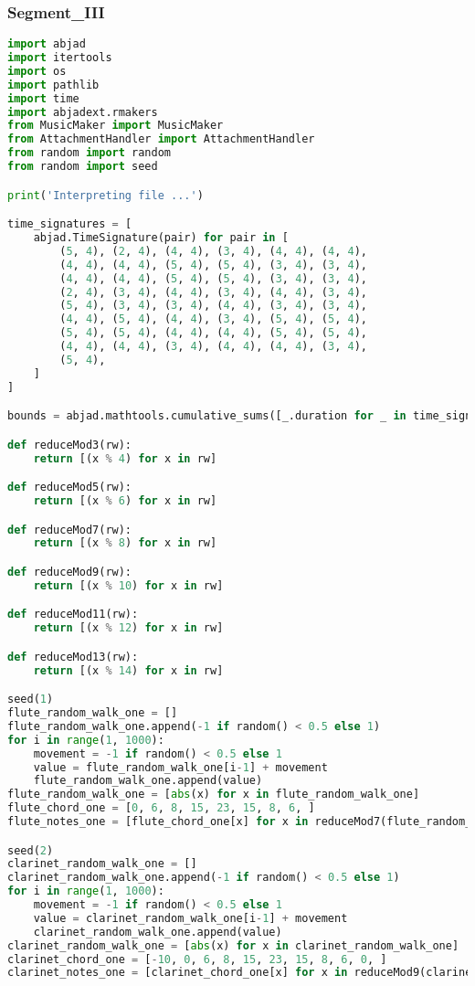 \subsubsection{Segment\_III}
\singlespace
\begin{lstlisting}[language=Python, caption=Tianshu Segment\_III]
import abjad
import itertools
import os
import pathlib
import time
import abjadext.rmakers
from MusicMaker import MusicMaker
from AttachmentHandler import AttachmentHandler
from random import random
from random import seed

print('Interpreting file ...')

time_signatures = [
    abjad.TimeSignature(pair) for pair in [
        (5, 4), (2, 4), (4, 4), (3, 4), (4, 4), (4, 4),
        (4, 4), (4, 4), (5, 4), (5, 4), (3, 4), (3, 4),
        (4, 4), (4, 4), (5, 4), (5, 4), (3, 4), (3, 4),
        (2, 4), (3, 4), (4, 4), (3, 4), (4, 4), (3, 4),
        (5, 4), (3, 4), (3, 4), (4, 4), (3, 4), (3, 4),
        (4, 4), (5, 4), (4, 4), (3, 4), (5, 4), (5, 4),
        (5, 4), (5, 4), (4, 4), (4, 4), (5, 4), (5, 4),
        (4, 4), (4, 4), (3, 4), (4, 4), (4, 4), (3, 4),
        (5, 4),
    ]
]

bounds = abjad.mathtools.cumulative_sums([_.duration for _ in time_signatures])

def reduceMod3(rw):
    return [(x % 4) for x in rw]

def reduceMod5(rw):
    return [(x % 6) for x in rw]

def reduceMod7(rw):
    return [(x % 8) for x in rw]

def reduceMod9(rw):
    return [(x % 10) for x in rw]

def reduceMod11(rw):
    return [(x % 12) for x in rw]

def reduceMod13(rw):
    return [(x % 14) for x in rw]

seed(1)
flute_random_walk_one = []
flute_random_walk_one.append(-1 if random() < 0.5 else 1)
for i in range(1, 1000):
    movement = -1 if random() < 0.5 else 1
    value = flute_random_walk_one[i-1] + movement
    flute_random_walk_one.append(value)
flute_random_walk_one = [abs(x) for x in flute_random_walk_one]
flute_chord_one = [0, 6, 8, 15, 23, 15, 8, 6, ]
flute_notes_one = [flute_chord_one[x] for x in reduceMod7(flute_random_walk_one)]

seed(2)
clarinet_random_walk_one = []
clarinet_random_walk_one.append(-1 if random() < 0.5 else 1)
for i in range(1, 1000):
    movement = -1 if random() < 0.5 else 1
    value = clarinet_random_walk_one[i-1] + movement
    clarinet_random_walk_one.append(value)
clarinet_random_walk_one = [abs(x) for x in clarinet_random_walk_one]
clarinet_chord_one = [-10, 0, 6, 8, 15, 23, 15, 8, 6, 0, ]
clarinet_notes_one = [clarinet_chord_one[x] for x in reduceMod9(clarinet_random_walk_one)]


\end{lstlisting}
